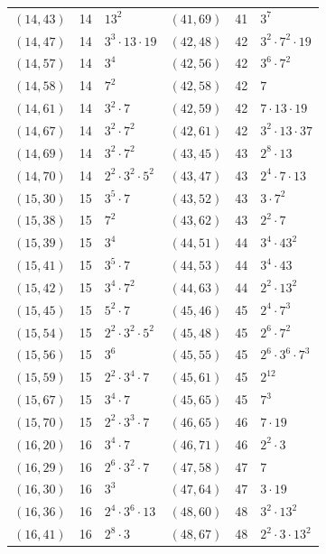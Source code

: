\documentclass[11pt]{article}
\begin{document}
\begin{longtable}{@{}lrl@{\qquad}lrl@{}}
$(14,43)$ & 14 & $13^{2}$ & $(41,69)$ & 41 & $3^{7}$\\
$(14,47)$ & 14 & $3^{3}\cdot 13\cdot 19$ & $(42,48)$ & 42 & $3^{2}\cdot 7^{2}\cdot 19$\\
$(14,57)$ & 14 & $3^{4}$ & $(42,56)$ & 42 & $3^{6}\cdot 7^{2}$\\
$(14,58)$ & 14 & $7^{2}$ & $(42,58)$ & 42 & $7$\\
$(14,61)$ & 14 & $3^{2}\cdot 7$ & $(42,59)$ & 42 & $7\cdot 13\cdot 19$\\
$(14,67)$ & 14 & $3^{2}\cdot 7^{2}$ & $(42,61)$ & 42 & $3^{2}\cdot 13\cdot 37$\\
$(14,69)$ & 14 & $3^{2}\cdot 7^{2}$ & $(43,45)$ & 43 & $2^{8}\cdot 13$\\
$(14,70)$ & 14 & $2^{2}\cdot 3^{2}\cdot 5^{2}$ & $(43,47)$ & 43 & $2^{4}\cdot 7\cdot 13$\\
$(15,30)$ & 15 & $3^{5}\cdot 7$ & $(43,52)$ & 43 & $3\cdot 7^{2}$\\
$(15,38)$ & 15 & $7^{2}$ & $(43,62)$ & 43 & $2^{2}\cdot 7$\\
$(15,39)$ & 15 & $3^{4}$ & $(44,51)$ & 44 & $3^{4}\cdot 43^{2}$\\
$(15,41)$ & 15 & $3^{5}\cdot 7$ & $(44,53)$ & 44 & $3^{4}\cdot 43$\\
$(15,42)$ & 15 & $3^{4}\cdot 7^{2}$ & $(44,63)$ & 44 & $2^{2}\cdot 13^{2}$\\
$(15,45)$ & 15 & $5^{2}\cdot 7$ & $(45,46)$ & 45 & $2^{4}\cdot 7^{3}$\\
$(15,54)$ & 15 & $2^{2}\cdot 3^{2}\cdot 5^{2}$ & $(45,48)$ & 45 & $2^{6}\cdot 7^{2}$\\
$(15,56)$ & 15 & $3^{6}$ & $(45,55)$ & 45 & $2^{6}\cdot 3^{6}\cdot 7^{3}$\\
$(15,59)$ & 15 & $2^{2}\cdot 3^{4}\cdot 7$ & $(45,61)$ & 45 & $2^{12}$\\
$(15,67)$ & 15 & $3^{4}\cdot 7$ & $(45,65)$ & 45 & $7^{3}$\\
$(15,70)$ & 15 & $2^{2}\cdot 3^{3}\cdot 7$ & $(46,65)$ & 46 & $7\cdot 19$\\
$(16,20)$ & 16 & $3^{4}\cdot 7$ & $(46,71)$ & 46 & $2^{2}\cdot 3$\\
$(16,29)$ & 16 & $2^{6}\cdot 3^{2}\cdot 7$ & $(47,58)$ & 47 & $7$\\
$(16,30)$ & 16 & $3^{3}$ & $(47,64)$ & 47 & $3\cdot 19$\\
$(16,36)$ & 16 & $2^{4}\cdot 3^{6}\cdot 13$ & $(48,60)$ & 48 & $3^{2}\cdot 13^{2}$\\
$(16,41)$ & 16 & $2^{8}\cdot 3$ & $(48,67)$ & 48 & $2^{2}\cdot 3\cdot 13^{2}$\\

\end{longtable}
\end{document}
